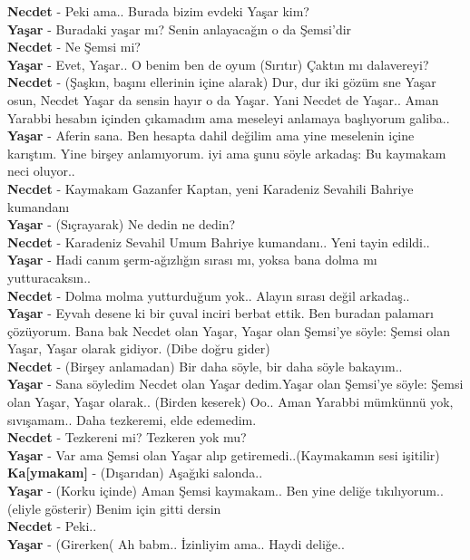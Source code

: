 \documentclass[]{book}
\begin{document}
\textbf{Necdet} - Peki ama.. Burada bizim evdeki Yaşar kim?\\
\textbf{Yaşar} - Buradaki yaşar mı? Senin anlayacağın o da Şemsi'dir\\
\textbf{Necdet} - Ne Şemsi mi?\\
\textbf{Yaşar} - Evet, Yaşar.. O benim ben de oyum (Sırıtır) Çaktın mı dalavereyi?\\
\textbf{Necdet} - (Şaşkın, başını ellerinin içine alarak) Dur, dur iki gözüm sne Yaşar osun, Necdet Yaşar da sensin hayır o da Yaşar. Yani Necdet de Yaşar.. Aman Yarabbi hesabın içinden çıkamadım ama meseleyi anlamaya başlıyorum galiba..\\
\textbf{Yaşar} - Aferin sana. Ben hesapta dahil değilim ama yine meselenin içine karıştım. Yine birşey anlamıyorum. iyi ama şunu söyle arkadaş: Bu kaymakam neci oluyor..\\
\textbf{Necdet} - Kaymakam Gazanfer Kaptan, yeni Karadeniz Sevahili Bahriye kumandanı\\
\textbf{Yaşar} - (Sıçrayarak) Ne dedin ne dedin?\\
\textbf{Necdet} - Karadeniz Sevahil Umum Bahriye kumandanı.. Yeni tayin edildi..\\
\textbf{Yaşar} - Hadi canım şerm-ağızlığın sırası mı, yoksa bana dolma mı yutturacaksın..\\
\textbf{Necdet} - Dolma molma yutturduğum yok.. Alayın sırası değil arkadaş..\\
\textbf{Yaşar} - Eyvah desene ki bir çuval inciri berbat ettik. Ben buradan palamarı çözüyorum. Bana bak Necdet olan Yaşar, Yaşar olan Şemsi'ye söyle: Şemsi olan Yaşar, Yaşar olarak gidiyor. (Dibe doğru gider)\\
\textbf{Necdet} - (Birşey anlamadan) Bir daha söyle, bir daha söyle bakayım..\\
\textbf{Yaşar} - Sana söyledim Necdet olan Yaşar dedim.Yaşar olan Şemsi'ye söyle: Şemsi olan Yaşar, Yaşar olarak.. (Birden keserek) Oo.. Aman Yarabbi mümkünnü yok, sıvışamam.. Daha tezkeremi, elde edemedim.\\
\textbf{Necdet} - Tezkereni mi? Tezkeren yok mu?\\
\textbf{Yaşar} - Var ama Şemsi olan Yaşar alıp getiremedi..(Kaymakamın sesi işitilir)\\
\textbf{Ka{[}ymakam{]}} - (Dışarıdan) Aşağıki salonda..\\
\textbf{Yaşar} - (Korku içinde) Aman Şemsi kaymakam.. Ben yine deliğe tıkılıyorum.. (eliyle gösterir) Benim için gitti dersin\\
\textbf{Necdet} - Peki..\\
\textbf{Yaşar} - (Girerken( Ah babm.. İzinliyim ama.. Haydi deliğe..\\
\end{document}
